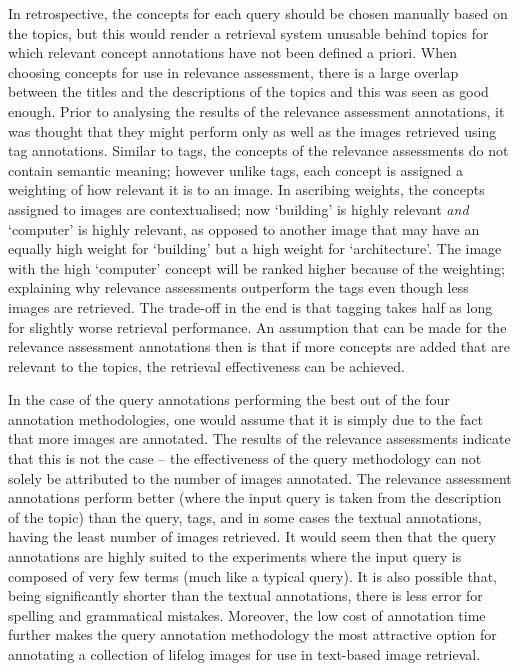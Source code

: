 In retrospective, the concepts for each query should be chosen manually based on the topics, but this would render a retrieval system unusable behind topics for which relevant concept annotations have not been defined a priori. When choosing concepts for use in relevance assessment, there is a large overlap between the titles and the descriptions of the topics and this was seen as good enough. Prior to analysing the results of the relevance assessment annotations, it was thought that they might perform only as well as the images retrieved using tag annotations. Similar to tags, the concepts of the relevance assessments do not contain semantic meaning; however unlike tags, each concept is assigned a weighting of how relevant it is to an image. In ascribing weights, the concepts assigned to images are contextualised; now `building' is highly relevant \textit{and} `computer' is highly relevant, as opposed to another image that may have an equally high weight for `building' but a high weight for `architecture'. The image with the high `computer' concept will be ranked higher because of the weighting; explaining why relevance assessments outperform the tags even though less images are retrieved. The trade-off in the end is that tagging takes half as long for slightly worse retrieval performance. An assumption that can be made for the relevance assessment annotations then is that if more concepts are added that are relevant to the topics, the retrieval effectiveness can be achieved.

In the case of the query annotations performing the best out of the four annotation methodologies, one would assume that it is simply due to the fact that more images are annotated. The results of the relevance assessments indicate that this is not the case -- the effectiveness of the query methodology can not solely be attributed to the number of images annotated. The relevance assessment annotations perform better (where the input query is taken from the description of the topic) than the query, tags, and in some cases the textual annotations, having the least number of images retrieved. It would seem then that the query annotations are highly suited to the experiments where the input query is composed of very few terms (much like a typical query). It is also possible that, being significantly shorter than the textual annotations, there is less error for spelling and grammatical mistakes. Moreover, the low cost of annotation time further makes the query annotation methodology the most attractive option for annotating a collection of lifelog images for use in text-based image retrieval.

